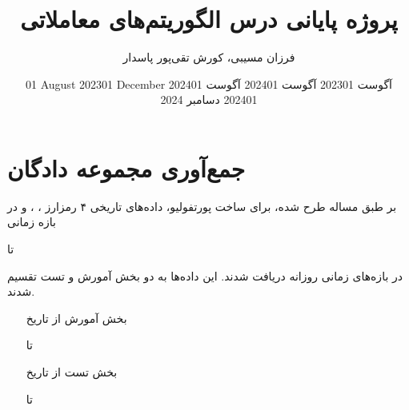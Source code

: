 \documentclass[12pt]{article}
\title{پروژه پایانی درس الگوریتم‌های معاملاتی}
\author{فرزان مسیبی، کورش تقی‌پور پاسدار}
\begin{document}
	\maketitle
	\newpage
	\section{جمع‌آوری مجموعه دادگان}
	بر طبق مساله طرح شده، برای ساخت پورتفولیو، داده‌های تاریخی ۴ رمزارز ، ،  و  در بازه زمانی \date{01 August 2023} تا \date{01 December 2024} در بازه‌های زمانی روزانه دریافت شدند. این داده‌ها به دو بخش آمورش و تست تقسیم شدند.
	\begin{itemize}
		\item[بخش آمورش] از تاریخ \date{01 آگوست 2023} تا \date{01 آگوست 2024}
		\item[بخش تست] از تاریخ \date{01 آگوست 2024} تا \date{01 دسامبر 2024}
	\end{itemize}
\end{document}
